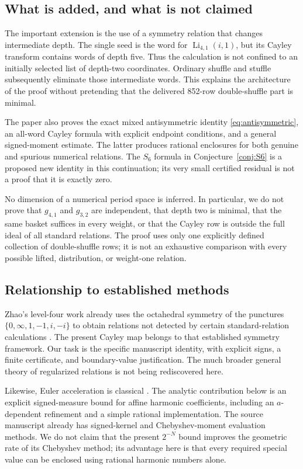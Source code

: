 \documentclass[11pt,letterpaper]{article}
\numberwithin{equation}{section}
\theoremstyle{definition}
\DeclareMathOperator{\Li}{Li}
\begin{document}
\subsection{What is added, and what is not claimed}
The important extension is the use of a symmetry relation that changes
intermediate depth. The single seed is the word for $\Li_{4,1}(i,1)$, but
its Cayley transform contains words of depth five. Thus the calculation is
not confined to an initially selected list of depth-two coordinates.
Ordinary shuffle and stuffle subsequently eliminate those intermediate
words. This explains the architecture of the proof without pretending
that the delivered 852-row double-shuffle part is minimal.

The paper also proves the exact mixed antisymmetric identity
\eqref{eq:antisymmetric}, an all-word Cayley formula with explicit endpoint
conditions, and a general signed-moment estimate. The latter produces
rational enclosures for both genuine and spurious numerical relations.
The $S_6$ formula in Conjecture~\ref{conj:S6} is a proposed new identity in
this continuation; its very small certified residual is not a proof that
it is exactly zero.

No dimension of a numerical period space is inferred. In particular, we
do not prove that $g_{4,1}$ and $g_{3,2}$ are independent, that depth two is
minimal, that the same basket suffices in every weight, or that the
Cayley row is outside the full ideal of all standard relations. The proof
uses only one explicitly defined collection of double-shuffle rows; it
is not an exhaustive comparison with every possible lifted, distribution,
or weight-one relation.

\subsection{Relationship to established methods}
Zhao's level-four work already uses the octahedral symmetry of the punctures
$\{0,\infty,1,-1,i,-i\}$ to obtain relations not detected by certain
standard-relation calculations \cite{Zhao2008,Zhao2010}. The present Cayley
map belongs to that established symmetry framework. Our task is the
specific manuscript identity, with explicit signs, a finite certificate,
and boundary-value justification. The much broader general theory of
regularized relations is not being rediscovered here.

Likewise, Euler acceleration is classical \cite{DLMF}. The analytic
contribution below is an explicit signed-measure bound for affine harmonic
coefficients, including an $a$-dependent refinement and a simple rational
implementation. The source manuscript already has signed-kernel and
Chebyshev-moment evaluation methods. We do not claim that the present
$2^{-N}$ bound improves the geometric rate of its Chebyshev method; its
advantage here is that every required special value can be enclosed using
rational harmonic numbers alone.
\end{document}
